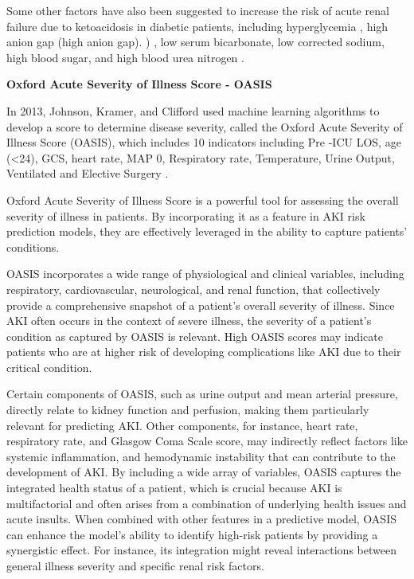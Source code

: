 \documentclass[sn-mathphys-num]{sn-jnl}%
\theoremstyle{thmstyleone}%
\theoremstyle{thmstyletwo}%
\theoremstyle{thmstylethree}%
\begin{document}
Some other factors have also been suggested to increase the risk of acute renal failure due to ketoacidosis in diabetic patients, including hyperglycemia \cite{chen2020incidence}, high anion gap (high anion gap). ) \cite{yang2021acute}, low serum bicarbonate, low corrected sodium, high blood sugar, and high blood urea nitrogen \cite{meena2023incidence}.


\textbf{Oxford Acute Severity of Illness Score - OASIS} 

In 2013, Johnson, Kramer, and Clifford used machine learning algorithms to develop a score to determine disease severity, called the Oxford Acute Severity of Illness Score (OASIS), which includes 10 indicators including Pre -ICU LOS, age (<24), GCS, heart rate, MAP 0, Respiratory rate, Temperature, Urine Output, Ventilated and Elective Surgery \cite{johnson2013new}.

Oxford Acute Severity of Illness Score is a powerful tool for assessing the overall severity of illness in patients. By incorporating it as a feature in AKI risk prediction models, they are effectively leveraged in the ability to capture patients' conditions.

OASIS incorporates a wide range of physiological and clinical variables, including respiratory, cardiovascular, neurological, and renal function, that collectively provide a comprehensive snapshot of a patient's overall severity of illness. 
Since AKI often occurs in the context of severe illness, the severity of a patient’s condition as captured by OASIS is relevant. High OASIS scores may indicate patients who are at higher risk of developing complications like AKI due to their critical condition.

Certain components of OASIS, such as urine output and mean arterial pressure, directly relate to kidney function and perfusion, making them particularly relevant for predicting AKI. Other components, for instance, heart rate, respiratory rate, and Glasgow Coma Scale score, may indirectly reflect factors like systemic inflammation, and hemodynamic instability that can contribute to the development of AKI. By including a wide array of variables, OASIS captures the integrated health status of a patient, which is crucial because AKI is multifactorial and often arises from a combination of underlying health issues and acute insults. When combined with other features in a predictive model, OASIS can enhance the model’s ability to identify high-risk patients by providing a synergistic effect. For instance, its integration might reveal interactions between general illness severity and specific renal risk factors.
\end{document}
